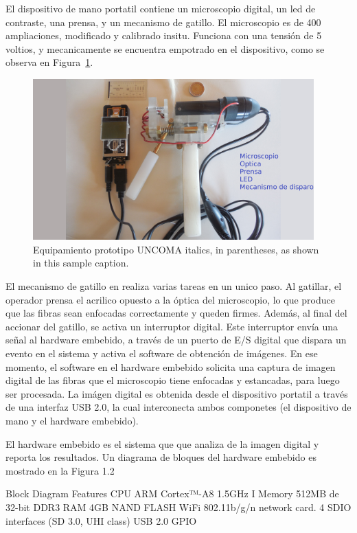 \documentclass[runningheads,a4paper]{llncs}
\begin{document}
El dispositivo de mano portatil contiene un microscopio digital, un led de contraste, una prensa, y un mecanismo de gatillo.
El microscopio es de 400 ampliaciones, modificado y calibrado insitu. Funciona con una tensión de 5 voltios, y mecanicamente se encuentra empotrado en el dispositivo, como se observa en Figura~\ref{fig:prototipo}.
\begin{figure}
\centering
\includegraphics[height=6.2cm]{prototipo}
\caption{Equipamiento prototipo UNCOMA
italics, in parentheses, as shown in this sample caption.}
\label{fig:prototipo}
\end{figure}

El mecanismo de gatillo en realiza varias tareas en un unico paso. Al gatillar, el operador prensa el acrilico opuesto a la óptica del microscopio, lo que produce que las fibras sean enfocadas correctamente y queden firmes. Además, al final del accionar del gatillo, se activa un interruptor digital. Este interruptor envía una señal al hardware embebido, a través de un puerto de E/S digital que dispara un evento en el sistema y activa el software de obtención de imágenes.
En ese momento, el software en el hardware embebido solicita una captura de imagen digital de las fibras que el microscopio tiene enfocadas y estancadas, para luego ser procesada. La imágen digital es obtenida desde el dispositivo portatil a través de una interfaz USB 2.0, la cual interconecta ambos componetes (el dispositivo de mano y el hardware embebido).

El hardware embebido es el sistema que
que analiza de la imagen digital y reporta los resultados.
Un diagrama de bloques del hardware embebido es mostrado en la Figura 1.2



Block Diagram
Features
CPU ARM Cortex™-A8 1.5GHz I
Memory 512MB de 32-bit DDR3 RAM
4GB NAND FLASH
WiFi 802.11b/g/n network card. 
4 SDIO interfaces (SD 3.0, UHI class)
USB 2.0
GPIO
\end{document}
